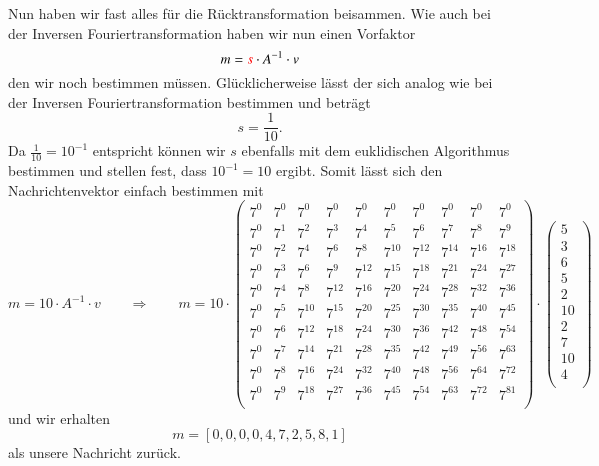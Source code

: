 Nun haben wir fast alles für die Rücktransformation beisammen. Wie auch bei der Inversen Fouriertransformation haben wir nun einen Vorfaktor
\[
m = \textcolor{red}{s} \cdot A^{-1} \cdot v
\]
den wir noch bestimmen müssen. 
Glücklicherweise lässt der sich analog wie bei der Inversen Fouriertransformation bestimmen und beträgt
\[
s = \frac{1}{10}.
\]
Da $\frac{1}{10} = 10^{-1}$ entspricht können wir $s$ ebenfalls mit dem euklidischen Algorithmus bestimmen und stellen fest, dass $10^{-1} = 10$ ergibt.
Somit lässt sich den Nachrichtenvektor einfach bestimmen mit
\[
m = 10 \cdot A^{-1} \cdot v \qquad \Rightarrow \qquad m = 10 \cdot \begin{pmatrix}
	7^0&    7^0&    7^0&    7^0&    7^0&    7^0&    7^0&    7^0&    7^0&    7^0\\
	7^0&	7^1&	7^2&	7^3&	7^4&	7^5&	7^6&	7^7&    7^8&	7^9\\
	7^0&	7^2&	7^4&	7^6&	7^8& 7^{10}& 7^{12}& 7^{14}& 7^{16}& 7^{18}\\
	7^0&	7^3&	7^6&	7^9& 7^{12}& 7^{15}& 7^{18}& 7^{21}& 7^{24}& 7^{27}\\
	7^0&	7^4&	7^8& 7^{12}& 7^{16}& 7^{20}& 7^{24}& 7^{28}& 7^{32}& 7^{36}\\
	7^0&	7^5& 7^{10}& 7^{15}& 7^{20}& 7^{25}& 7^{30}& 7^{35}& 7^{40}& 7^{45}\\
	7^0&	7^6& 7^{12}& 7^{18}& 7^{24}& 7^{30}& 7^{36}& 7^{42}& 7^{48}& 7^{54}\\
	7^0&	7^7& 7^{14}& 7^{21}& 7^{28}& 7^{35}& 7^{42}& 7^{49}& 7^{56}& 7^{63}\\
	7^0&	7^8& 7^{16}& 7^{24}& 7^{32}& 7^{40}& 7^{48}& 7^{56}& 7^{64}& 7^{72}\\
	7^0&	7^9& 7^{18}& 7^{27}& 7^{36}& 7^{45}& 7^{54}& 7^{63}& 7^{72}& 7^{81}\\
\end{pmatrix}
\cdot
\begin{pmatrix}
	5 \\ 3 \\ 6 \\ 5 \\ 2 \\ 10 \\ 2 \\ 7 \\ 10 \\ 4 \\
\end{pmatrix}
\]
und wir erhalten
\[
m = [0,0,0,0,4,7,2,5,8,1]
\]
als unsere Nachricht zurück.